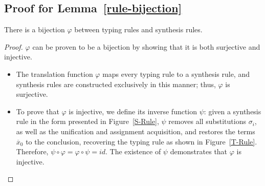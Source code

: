 \documentclass[manuscript,screen]{acmart}
\begin{document}
\subsection{Proof for Lemma~\ref{rule-bijection}}
\label{sec:appendix-lemma1}
\begin{lemma}
There is a bijection $\varphi$ between typing rules and synthesis rules.
\end{lemma}
\begin{proof}

$\varphi$ can be proven to be a bijection by showing that it is both surjective and injective.
\begin{itemize}
 \item The translation function $\varphi$ maps every typing rule to a synthesis rule, and synthesis rules are constructed exclusively in this manner; thus, $\varphi$ is surjective.
 \item To prove that $\varphi$ is injective, we define its inverse function $\psi$: given a synthesis rule in the form presented in Figure~\ref{S-Rule}, $\psi$ removes all substitutions $\sigma_i$, as well as the unification and assignment acquisition, and restores the terms $\overline{x}_0$ to the conclusion, recovering the typing rule as shown in Figure~\ref{T-Rule}. Therefore, $\psi \circ \varphi = \varphi \circ \psi = id$. The existence of $\psi$ demonstrates that $\varphi$ is injective.
\end{itemize}

\end{proof}
\end{document}
